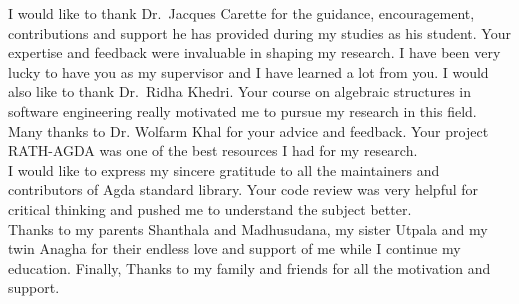 
I would like to thank Dr.\  Jacques Carette for the guidance, encouragement, contributions and support he has provided during my studies as his student. Your expertise and feedback were invaluable in shaping my research. I have been very lucky to have you as my supervisor and I have learned a lot from you. I would also like to thank Dr.\  Ridha Khedri. Your course on algebraic structures in software engineering really motivated me to pursue my research in this field. Many thanks to Dr. Wolfarm Khal for your advice and feedback. Your project RATH-AGDA was one of the best resources I had for my research.\\

I would like to express my sincere gratitude to all the maintainers and contributors of Agda standard library. Your code review was very helpful for critical thinking and pushed me to understand the subject better. \\

Thanks to my parents Shanthala and Madhusudana, my sister Utpala and my twin Anagha for their endless love and support of me while I continue my education. Finally, Thanks to my family and friends for all the motivation and support.